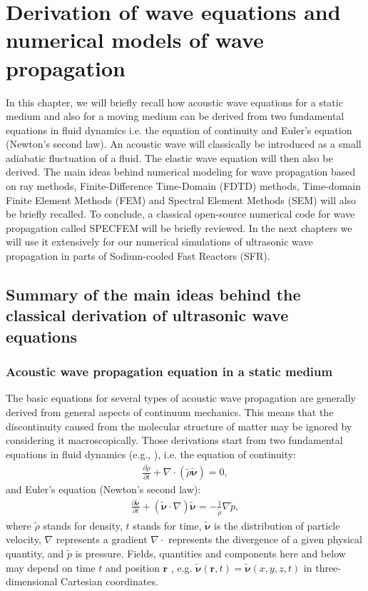 \chapter{Derivation of wave equations and numerical models of wave propagation}
\label{chap:1}

In this chapter, we will briefly recall how acoustic wave equations for a static medium and also for a moving medium can be derived from two fundamental equations in fluid dynamics i.e.
the equation of continuity and Euler's equation (Newton's second law). An acoustic wave will classically be introduced as a small adiabatic fluctuation of a fluid. The elastic wave
equation will then also be derived. The main ideas behind numerical modeling for wave propagation based on ray methods, Finite-Difference Time-Domain (FDTD) methods, Time-domain Finite Element Methods (FEM) and Spectral Element Methods (SEM) will also be briefly recalled. To conclude, a classical open-source numerical code for wave propagation called SPECFEM will be
briefly reviewed. In the next chapters we will use it extensively for our numerical simulations of ultrasonic wave propagation in parts of Sodium-cooled Fast Reactors (SFR).

\section{Summary of the main ideas behind the classical derivation of ultrasonic wave equations}

    \subsection{Acoustic wave propagation equation in a static medium}

        The basic equations for several types of acoustic wave propagation are generally derived from general aspects of continuum mechanics. This means that the
discontinuity caused from the molecular structure of matter may be ignored by considering it macroscopically. Those derivations start from two fundamental
equations in fluid dynamics (e.g., \cite{Landau1987Fluidmechanics}),
        i.e. the equation of continuity:
        \begin{align} \label{eq:1_1}
            \frac{\partial \tilde{\rho}}{\partial t} + \nabla \cdot (\tilde{\rho} \tilde{\bm{\nu}}) = 0,
        \end{align}
        and Euler's equation (Newton's second law):
        \begin{align} \label{eq:1_2}
            \frac{\partial \tilde{\bm{\nu}}}{\partial t} + (\tilde{\bm{\nu}} \cdot \nabla)\tilde{\bm{\nu}} = - \frac{1}{\tilde{\rho}}\nabla\tilde{p},
        \end{align}
        where $\tilde{\rho}$ stands for density, $t$ stands for time, $\tilde{\bm{\nu}}$ is the distribution of particle velocity, $\nabla$ represents a gradient
 $\nabla \cdot$ represents the divergence of a given physical quantity, and $\tilde{p}$ is pressure. Fields, quantities and components here and below
may depend on time $t$ and position $\bm{r}$ , e.g.
$\tilde{\bm{\nu}}(\bm{r},t) = \tilde{\bm{\nu}}(x,y,z,t)$ in three-dimensional Cartesian coordinates.

